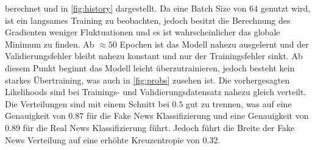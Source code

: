 berechnet und in \ref{fig:history} dargestellt. 
Da eine Batch Size von $64$ genutzt wird, ist ein langsames Training zu beobachten, jedoch besitzt die Berechnung 
des Gradienten weniger Fluktuationen und es ist wahrscheinlicher das globale Minimum zu finden. 
Ab $\approx 50$ Epochen ist das Modell nahezu ausgelernt und der Validierungsfehler bleibt nahezu konstant und 
nur der Trainingsfehler sinkt. 
Ab diesem Punkt beginnt das Modell leicht überzutrainieren, jedoch besteht kein starkes Übertraining, was auch in 
\ref{fig:probs} zusehen ist.
Die vorhergesagten Likelihoods sind bei Trainings- und Validierungsdatensatz nahezu gleich verteilt.
Die Verteilungen sind mit einem Schnitt bei $0.5$ gut zu trennen, was auf eine Genauigkeit von $0.87$ für die 
Fake News Klassifizierung und eine Genauigkeit von $0.89$ für die Real News Klassifizierung führt.
Jedoch führt die Breite der Fake News Verteilung auf eine erhöhte Kreuzentropie von $0.32$.

